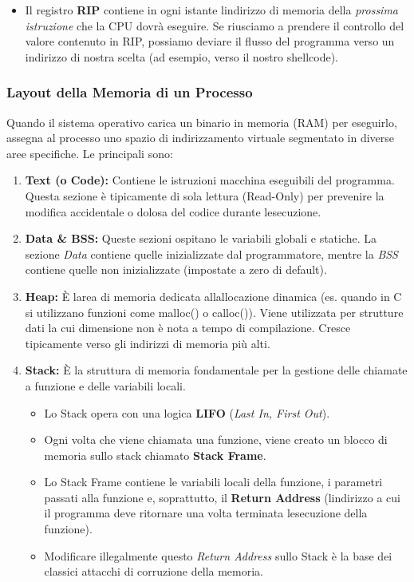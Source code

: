 \documentclass[11pt,a4paper]{article}
\providecommand{\tightlist}{%
  \setlength{\itemsep}{0pt}\setlength{\parskip}{0pt}}
\begin{document}
\begin{itemize}
\tightlist
\item
  Il registro \textbf{RIP} contiene in ogni istante
  l\textquotesingle indirizzo di memoria della \emph{prossima
  istruzione} che la CPU dovrà eseguire. Se riusciamo a prendere il
  controllo del valore contenuto in RIP, possiamo deviare il flusso del
  programma verso un indirizzo di nostra scelta (ad esempio, verso il
  nostro shellcode).
\end{itemize}

\subsubsection{Layout della Memoria di un
Processo}\label{layout-della-memoria-di-un-processo}

Quando il sistema operativo carica un binario in memoria (RAM) per
eseguirlo, assegna al processo uno spazio di indirizzamento virtuale
segmentato in diverse aree specifiche. Le principali sono:

\begin{enumerate}
\def\labelenumi{\arabic{enumi}.}
\item
  \textbf{Text (o Code):} Contiene le istruzioni macchina eseguibili del
  programma. Questa sezione è tipicamente di sola lettura (Read-Only)
  per prevenire la modifica accidentale o dolosa del codice durante
  l\textquotesingle esecuzione.
\item
  \textbf{Data \& BSS:} Queste sezioni ospitano le variabili globali e
  statiche. La sezione \emph{Data} contiene quelle inizializzate dal
  programmatore, mentre la \emph{BSS} contiene quelle non inizializzate
  (impostate a zero di default).
\item
  \textbf{Heap:} È l\textquotesingle area di memoria dedicata
  all\textquotesingle allocazione dinamica (es. quando in C si
  utilizzano funzioni come malloc() o calloc()). Viene utilizzata per
  strutture dati la cui dimensione non è nota a tempo di compilazione.
  Cresce tipicamente verso gli indirizzi di memoria più alti.
\item
  \textbf{Stack:} È la struttura di memoria fondamentale per la gestione
  delle chiamate a funzione e delle variabili locali.

  \begin{itemize}
  \item
    Lo Stack opera con una logica \textbf{LIFO} (\emph{Last In, First
    Out}).
  \item
    Ogni volta che viene chiamata una funzione, viene creato un blocco
    di memoria sullo stack chiamato \textbf{Stack Frame}.
  \item
    Lo Stack Frame contiene le variabili locali della funzione, i
    parametri passati alla funzione e, soprattutto, il \textbf{Return
    Address} (l\textquotesingle indirizzo a cui il programma deve
    ritornare una volta terminata l\textquotesingle esecuzione della
    funzione).
  \item
    Modificare illegalmente questo \emph{Return Address} sullo Stack è
    la base dei classici attacchi di corruzione della memoria.
  \end{itemize}
\end{enumerate}
\end{document}
